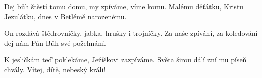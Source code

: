 \vskip-5mm
\IncludeLilypond

Dej bůh štěstí tomu domu,
my zpíváme, víme komu.
Malému děťátku, Kristu Jezulátku,
dnes v Betlémě narozenému.

On rozdává štědrovničky,
jabka, hrušky i trojníčky.
Za naše zpívání, za koledování
dej nám Pán Bůh své požehnání.

K jesličkám teď poklekáme,
Ježíškovi zazpíváme.
Světa širou dálí zní mu píseň chvály.
Vítej, dítě, nebeský králi!
